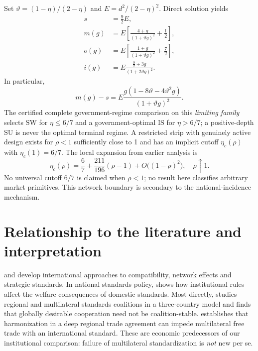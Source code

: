 \documentclass[11pt,a4paper]{article}
\theoremstyle{remark}\newtheorem{remark}[theorem]{Remark}
\newcommand{\SW}{\mathrm{SW}}\newcommand{\SU}{\mathrm{SU}}\newcommand{\IS}{\mathrm{IS}}
\begin{document}
Set $\vartheta=(1-\eta)/(2-\eta)$ and $E=d^2/(2-\eta)^2$. Direct solution yields
\begin{equation}\label{eq:face}
\begin{split}
s&=\tfrac92E,\\
m(g)&=E\left[\frac{4+g}{(1+\vartheta g)^2}+\tfrac12\right],\\
o(g)&=E\left[\frac{1+g}{(1+\vartheta g)^2}+\tfrac72\right],\\
i(g)&=E\frac{\tfrac92+3g}{(1+2\vartheta g)^2}.
\end{split}
\end{equation}
In particular,
\begin{equation}\label{eq:faceSign}
m(g)-s=E\frac{g(1-8\vartheta-4\vartheta^2g)}{(1+\vartheta g)^2}.
\end{equation}
The certified complete government-regime comparison on this \emph{limiting family} selects $\SW$ for $\eta\le6/7$ and a government-optimal $\IS$ for $\eta>6/7$; a positive-depth $\SU$ is never the optimal terminal regime. A restricted strip with genuinely active design exists for $\rho<1$ sufficiently close to 1 and has an implicit cutoff $\eta_c(\rho)$ with $\eta_c(1)=6/7$. The local expansion from earlier analysis is
\begin{equation}\label{eq:cutoffExpansion}
\eta_c(\rho)=\frac67+\frac{211}{196}(\rho-1)+O\big((1-\rho)^2\big),\quad \rho\uparrow1.
\end{equation}
No universal cutoff $6/7$ is claimed when $\rho<1$; no result here classifies arbitrary market primitives. This network boundary is secondary to the national-incidence mechanism.

\section{Relationship to the literature and interpretation}\label{sec:literature}
\citet{GandalShy2001} and \citet{Klimenko2009} develop international approaches to compatibility, network effects and strategic standards. In national standards policy, \citet{Costinot2008} shows how institutional rules affect the welfare consequences of domestic standards. Most directly, \citet{Takarada2020} studies regional and multilateral standards coalitions in a three-country model and finds that globally desirable cooperation need not be coalition-stable. \citet{Kawabata2021} establishes that harmonization in a deep regional trade agreement can impede multilateral free trade with an international standard. These are economic predecessors of our institutional comparison: failure of multilateral standardization is \emph{not} new per se.
\end{document}
